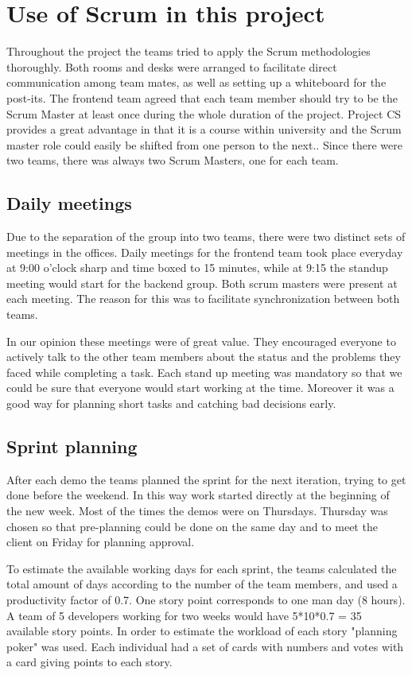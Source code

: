 \section{Use of Scrum in this project}
Throughout the project the teams tried to apply the Scrum methodologies thoroughly.
Both rooms and desks were arranged to facilitate direct communication among team mates, as well as setting up a whiteboard for the post-its. 
The frontend team agreed that each team member should try to
be the Scrum Master at least once during the whole duration of the project.
Project CS provides a great advantage in that it is a course within university and the Scrum master role could easily be shifted from one person to the next..
Since there were two teams, there was always two Scrum Masters, one for each team.

\subsection{Daily meetings}
Due to the separation of the group into two teams, there were two distinct sets of meetings in the offices.
Daily meetings for the frontend team took place everyday at 9:00 o'clock sharp and time boxed to 15 minutes,
while at 9:15 the standup meeting would start for the backend group.
Both scrum masters were present at each meeting.
The reason for this was to facilitate synchronization between both teams.

In our opinion these meetings were of great value. 
They encouraged everyone to actively talk to the other team members about
the status and the problems they faced while completing a task.
Each stand up meeting was mandatory so that we could be sure
that everyone would start working at the time. 
Moreover it was a good way for planning short tasks and catching bad decisions early.

\subsection{Sprint planning}
After each demo the teams planned the sprint for the next iteration, trying to get done before the weekend.
In this way work started directly at the beginning of the new week. Most of the times the demos were on Thursdays. Thursday was chosen so that pre-planning could be done on the same day and to meet the client on Friday for planning approval.

To estimate the available working days for each sprint, the teams calculated the total amount of days
according to the number of the team members, and used a productivity factor of 0.7. One story point corresponds to one man day (8 hours). A team of 5 developers working
for two weeks would have 5*10*0.7 = 35 available story points.
In order to estimate the workload of each story "planning poker" was used. Each individual had a set of cards
with numbers and votes with a card giving points to each story. 

